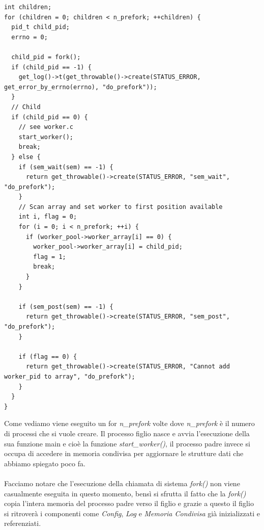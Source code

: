 \documentclass[italian]{tktltiki2}
\begin{document}
\begin{lstlisting}
int children;
for (children = 0; children < n_prefork; ++children) {
  pid_t child_pid;
  errno = 0;

  child_pid = fork();
  if (child_pid == -1) {
    get_log()->t(get_throwable()->create(STATUS_ERROR, get_error_by_errno(errno), "do_prefork"));
  }
  // Child 
  if (child_pid == 0) {
    // see worker.c
    start_worker();
    break;
  } else {
    if (sem_wait(sem) == -1) {
      return get_throwable()->create(STATUS_ERROR, "sem_wait", "do_prefork");
    }
    // Scan array and set worker to first position available
    int i, flag = 0;
    for (i = 0; i < n_prefork; ++i) {
      if (worker_pool->worker_array[i] == 0) {
        worker_pool->worker_array[i] = child_pid;
        flag = 1;
        break;
      }
    }

    if (sem_post(sem) == -1) {
      return get_throwable()->create(STATUS_ERROR, "sem_post", "do_prefork");
    }

    if (flag == 0) {
      return get_throwable()->create(STATUS_ERROR, "Cannot add worker_pid to array", "do_prefork");        
    }            
  }
}
\end{lstlisting}
Come vediamo viene eseguito un for \emph{n\_prefork} volte dove \emph{n\_prefork} è il numero di processi che si vuole creare. Il processo figlio nasce e avvia l'esecuzione della sua funzione main e cioè la funzione \emph{start\_worker()}, il processo padre invece si occupa di accedere in memoria condivisa per aggiornare le strutture dati che abbiamo spiegato poco fa. \\\\Facciamo notare che l'esecuzione della chiamata di sistema \emph{fork()} non viene casualmente eseguita in questo momento, bensì si sfrutta il fatto che la \emph{fork()} copia l'intera memoria del processo padre verso il figlio e grazie a questo il figlio si ritroverà i componenti come \emph{Config}, \emph{Log} e \emph{Memoria Condivisa} già inizializzati e referenziati.
\end{document}
